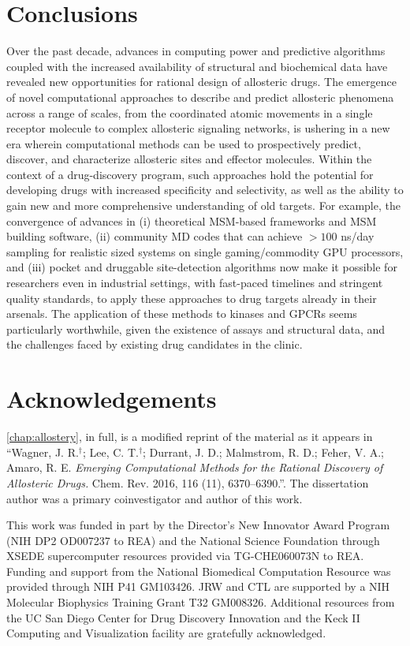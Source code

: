 \section{Conclusions}
\par Over the past decade, advances in computing power and predictive algorithms coupled with the increased availability of structural and biochemical data have revealed new opportunities for rational design of allosteric drugs. The emergence of novel computational approaches to describe and predict allosteric phenomena across a range of scales, from the coordinated atomic movements in a single receptor molecule to complex allosteric signaling networks, is ushering in a new era wherein computational methods can be used to prospectively predict, discover, and characterize allosteric sites and effector molecules. Within the context of a drug-discovery program, such approaches hold the potential for developing drugs with increased specificity and selectivity, as well as the ability to gain new and more comprehensive understanding of old targets. For example, the convergence of advances in (i) theoretical MSM-based frameworks and MSM building software, (ii) community MD codes that can achieve $>100$ ns/day sampling for realistic sized systems on single gaming/commodity GPU processors, and (iii) pocket and druggable site-detection algorithms now make it possible for researchers even in industrial settings, with fast-paced timelines and stringent quality standards, to apply these approaches to drug targets already in their arsenals. The application of these methods to kinases and GPCRs seems particularly worthwhile, given the existence of assays and structural data, and the challenges faced by existing drug candidates in the clinic.
\section{Acknowledgements}
\par \cref{chap:allostery}, in full, is a modified reprint of the material as it appears in ``Wagner, J. R.$^{\dagger}$; Lee, C. T.$^{\dagger}$; Durrant, J. D.; Malmstrom, R. D.; Feher, V. A.; Amaro, R. E. \emph{Emerging Computational Methods for the Rational Discovery of Allosteric Drugs.} Chem. Rev. 2016, 116 (11), 6370–6390.''.
The dissertation author was a primary coinvestigator and author of this work.

\par This work was funded in part by the Director's New Innovator Award Program (NIH DP2 OD007237 to REA) and the National Science Foundation through XSEDE supercomputer resources provided via TG-CHE060073N to REA. Funding and support from the National Biomedical Computation Resource was provided through NIH P41 GM103426. JRW and CTL are supported by a NIH Molecular Biophysics Training Grant T32 GM008326. Additional resources from the UC San Diego Center for Drug Discovery Innovation and the Keck II Computing and Visualization facility are gratefully acknowledged.
